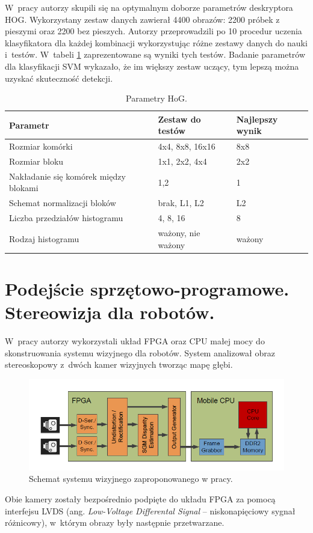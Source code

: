 W~pracy autorzy skupili się na optymalnym doborze parametrów deskryptora HOG. 
Wykorzystany zestaw danych zawierał 4400 obrazów: 2200 próbek z pieszymi oraz 2200 bez pieszych. 
Autorzy przeprowadzili po 10 procedur uczenia klasyfikatora dla każdej kombinacji wykorzystując różne zestawy danych do nauki i~testów. 
W~tabeli \ref{tab:parametryhog} zaprezentowane są wyniki tych testów. 
Badanie parametrów dla klasyfikacji SVM wykazało, że im większy zestaw uczący, tym lepszą można uzyskać skuteczność detekcji.

\begin{table}[!h]
\centering
\begin{threeparttable}
\caption{Parametry HoG.}
\label{tab:parametryhog}
\begin{tabularx}{1\textwidth}{|l|X|X|}

\hline Parametr & Zestaw do testów & Najlepszy wynik \\
\hline Rozmiar komórki & 4x4, 8x8, 16x16 & 8x8 \\
\hline Rozmiar bloku & 1x1, 2x2, 4x4 & 2x2 \\
\hline Nakładanie się komórek między blokami & 1,2 & 1 \\
\hline Schemat normalizacji bloków & brak, L1, L2 & L2 \\
\hline Liczba przedziałów histogramu & 4, 8, 16 & 8 \\
\hline Rodzaj histogramu & ważony, nie ważony & ważony \\
\hline

\end{tabularx}
\end{threeparttable}
\end{table}


\section{Podejście sprzętowo-programowe. Stereowizja dla robotów.}

W~pracy \cite{honegger2014real} autorzy wykorzystali układ FPGA oraz CPU małej mocy do skonstruowania systemu wizyjnego dla robotów.
System analizował obraz stereoskopowy z~dwóch kamer wizyjnych tworząc mapę głębi.
\begin{figure}[h]
\centering
\includegraphics[width=1\textwidth]{images/honegger2014real_Fig1}
\caption{Schemat systemu wizyjnego zaproponowanego w pracy\cite{honegger2014real}.}
\label{fig:honegger2014real_Fig1}
\end{figure}
Obie kamery zostały bezpośrednio podpięte do układu FPGA za pomocą interfejsu LVDS (ang. \textit{Low-Voltage Differental Signal} -- niskonapięciowy sygnał różnicowy), w~którym obrazy były następnie przetwarzane.

